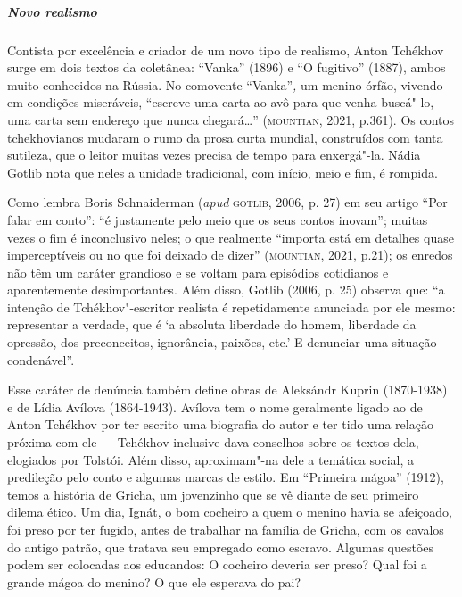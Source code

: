 \documentclass[11pt]{extarticle}
\begin{document}


\subparagraph{Novo realismo}
Contista por excelência e criador de um novo tipo de realismo, Anton
Tchékhov surge em dois textos da coletânea: ``Vanka'' (1896) e ``O
fugitivo'' (1887), ambos muito conhecidos na Rússia. No comovente
``Vanka''\emph{,} um menino órfão, vivendo em condições miseráveis,
``escreve uma carta ao avô para que venha buscá"-lo, uma carta sem
endereço que nunca chegará\ldots{}'' (\textsc{mountian}, 2021, p.361). Os contos
tchekhovianos mudaram o rumo da prosa curta mundial, construídos com
tanta sutileza, que o leitor muitas vezes precisa de tempo para
enxergá"-la. Nádia Gotlib nota que neles a unidade tradicional, com
início, meio e fim, é rompida.

Como lembra Boris Schnaiderman
(\emph{apud} \textsc{gotlib}, 2006, p. 27) em seu artigo ``Por falar em conto'':
``é justamente pelo meio que os seus contos inovam''; muitas vezes o fim
é inconclusivo neles; o que realmente ``importa está em detalhes quase
imperceptíveis ou no que foi deixado de dizer'' (\textsc{mountian}, 2021, p.21);
os enredos não têm um caráter grandioso e se voltam para episódios
cotidianos e aparentemente desimportantes. Além disso, Gotlib (2006, p.
25) observa que: ``a intenção de Tchékhov"-escritor realista é
repetidamente anunciada por ele mesmo: representar a verdade, que é `a
absoluta liberdade do homem, liberdade da opressão, dos preconceitos,
ignorância, paixões, etc.' E denunciar uma situação condenável''.


Esse caráter de denúncia também define obras de Aleksándr Kuprin
(1870-1938) e de Lídia Avílova (1864-1943). Avílova tem o nome
geralmente ligado ao de Anton Tchékhov por ter escrito uma biografia do
autor e ter tido uma relação próxima com ele --- Tchékhov inclusive dava
conselhos sobre os textos dela, elogiados por Tolstói. Além disso,
aproximam"-na dele a temática social, a predileção pelo conto e algumas
marcas de estilo. Em ``Primeira mágoa'' (1912), temos a história
de Gricha, um jovenzinho que se vê diante de seu primeiro dilema ético.
Um dia, Ignát, o bom cocheiro a quem o menino havia se afeiçoado, foi
preso por ter fugido, antes de trabalhar na família de Gricha, com os
cavalos do antigo patrão, que tratava seu empregado como escravo.
Algumas questões podem ser colocadas aos educandos: O cocheiro deveria
ser preso? Qual foi a grande mágoa do menino? O que ele esperava do pai?
\end{document}
